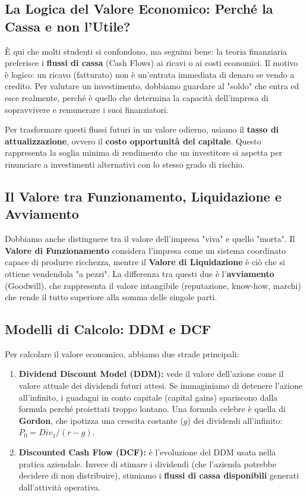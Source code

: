 \documentclass[a4paper,10pt]{article}
\begin{document}
\subsection*{La Logica del Valore Economico: Perché la Cassa e non l'Utile?}

È qui che molti studenti si confondono, ma seguimi bene: la teoria finanziaria preferisce i \textbf{flussi di cassa} (Cash Flows) ai ricavi o ai costi economici. Il motivo è logico: un ricavo (fatturato) non è un'entrata immediata di denaro se vendo a credito. Per valutare un investimento, dobbiamo guardare al "soldo" che entra ed esce realmente, perché è quello che determina la capacità dell'impresa di sopravvivere e remunerare i suoi finanziatori.

Per trasformare questi flussi futuri in un valore odierno, usiamo il \textbf{tasso di attualizzazione}, ovvero il \textbf{costo opportunità del capitale}. Questo rappresenta la soglia minima di rendimento che un investitore si aspetta per rinunciare a investimenti alternativi con lo stesso grado di rischio.

\subsection*{Il Valore tra Funzionamento, Liquidazione e Avviamento}

Dobbiamo anche distinguere tra il valore dell'impresa "viva" e quello "morta". Il \textbf{Valore di Funzionamento} considera l'impresa come un sistema coordinato capace di produrre ricchezza, mentre il \textbf{Valore di Liquidazione} è ciò che si ottiene vendendola "a pezzi". La differenza tra questi due è l'\textbf{avviamento} (Goodwill), che rappresenta il valore intangibile (reputazione, know-how, marchi) che rende il tutto superiore alla somma delle singole parti.

\subsection*{Modelli di Calcolo: DDM e DCF}

Per calcolare il valore economico, abbiamo due strade principali:

\begin{enumerate}
\item \textbf{Dividend Discount Model (DDM):} vede il valore dell'azione come il valore attuale dei dividendi futuri attesi. Se immaginiamo di detenere l'azione all'infinito, i guadagni in conto capitale (capital gains) spariscono dalla formula perché proiettati troppo lontano. Una formula celebre è quella di \textbf{Gordon}, che ipotizza una crescita costante ($g$) dei dividendi all'infinito: $P_0 = Div_1 / (r - g)$.

\item \textbf{Discounted Cash Flow (DCF):} è l'evoluzione del DDM usata nella pratica aziendale. Invece di stimare i dividendi (che l'azienda potrebbe decidere di non distribuire), stimiamo i \textbf{flussi di cassa disponibili} generati dall'attività operativa.

\end{enumerate}
\end{document}
